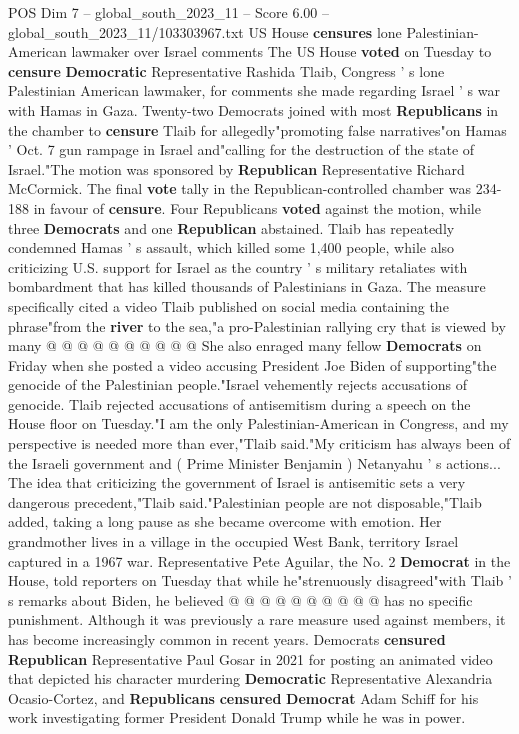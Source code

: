\begin{textsample}{POS Dim 7 – global\_south\_2023\_11 – Score 6.00 – global\_south\_2023\_11/103303967.txt}  \label{ex:f7_pos_306}
US House \textbf{censures} lone Palestinian-American lawmaker over Israel comments The US House \textbf{voted} on Tuesday to \textbf{censure} \textbf{Democratic} Representative Rashida Tlaib, Congress ' s lone Palestinian American lawmaker, for comments she made regarding Israel ' s war with Hamas in Gaza.
Twenty-two Democrats joined with most \textbf{Republicans} in the chamber to \textbf{censure} Tlaib for allegedly"promoting false narratives"on Hamas ' Oct. 7 gun rampage in Israel and"calling for the destruction of the state of Israel."The motion was sponsored by \textbf{Republican} Representative Richard McCormick.
The final \textbf{vote} tally in the Republican-controlled chamber was 234-188 in favour of \textbf{censure}.
Four Republicans \textbf{voted} against the motion, while three \textbf{Democrats} and one \textbf{Republican} abstained.
Tlaib has repeatedly condemned Hamas ' s assault, which killed some 1,400 people, while also criticizing U.S. support for Israel as the country ' s military retaliates with bombardment that has killed thousands of Palestinians in Gaza.
The measure specifically cited a video Tlaib published on social media containing the phrase"from the \textbf{river} to the sea,"a pro-Palestinian rallying cry that is viewed by many @ @ @ @ @ @ @ @ @ @ She also enraged many fellow \textbf{Democrats} on Friday when she posted a video accusing President Joe Biden of supporting"the genocide of the Palestinian people."Israel vehemently rejects accusations of genocide.
Tlaib rejected accusations of antisemitism during a speech on the House floor on Tuesday."I am the only Palestinian-American in Congress, and my perspective is needed more than ever,"Tlaib said."My criticism has always been of the Israeli government and ( Prime Minister Benjamin ) Netanyahu ' s actions...
The idea that criticizing the government of Israel is antisemitic sets a very dangerous precedent,"Tlaib said."Palestinian people are not disposable,"Tlaib added, taking a long pause as she became overcome with emotion.
Her grandmother lives in a village in the occupied West Bank, territory Israel captured in a 1967 war.
Representative Pete Aguilar, the No. 2 \textbf{Democrat} in the House, told reporters on Tuesday that while he"strenuously disagreed"with Tlaib ' s remarks about Biden, he believed @ @ @ @ @ @ @ @ @ @ has no specific punishment.
Although it was previously a rare measure used against members, it has become increasingly common in recent years.
Democrats \textbf{censured} \textbf{Republican} Representative Paul Gosar in 2021 for posting an animated video that depicted his character murdering \textbf{Democratic} Representative Alexandria Ocasio-Cortez, and \textbf{Republicans} \textbf{censured} \textbf{Democrat} Adam Schiff for his work investigating former President Donald Trump while he was in power.

\end{textsample}
